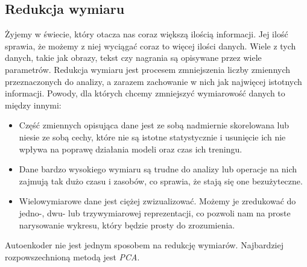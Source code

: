 \documentclass[a4paper,12pt,oneside]{book} %
\begin{document}
\subsection{Redukcja wymiaru}
Żyjemy w świecie, który otacza nas coraz większą ilością informacji. Jej ilość sprawia, że możemy z niej wyciągać coraz to więcej ilości danych. Wiele z tych danych, takie jak obrazy, tekst czy nagrania są opisywane przez wiele parametrów. Redukcja wymiaru jest procesem zmniejszenia liczby zmiennych przeznaczonych do analizy, a zarazem zachowanie w nich jak najwięcej istotnych informacji. Powody, dla których chcemy zmniejszyć wymiarowość danych to między innymi:
\begin{itemize}
	\item Część zmiennych opisująca dane jest ze sobą nadmiernie skorelowana lub niesie ze sobą cechy, które nie są istotne statystycznie i usunięcie ich nie wpływa na poprawę działania modeli oraz czas ich treningu.
	\item Dane bardzo wysokiego wymiaru są trudne do analizy lub operacje na nich zajmują tak dużo czasu i zasobów, co sprawia, że stają się one bezużyteczne. 
	\item Wielowymiarowe dane jest ciężej zwizualizować. Możemy je zredukować do jedno-, dwu- lub trzywymiarowej reprezentacji, co pozwoli nam na proste narysowanie wykresu, który będzie prosty do zrozumienia.
\end{itemize}
Autoenkoder nie jest jednym sposobem na redukcję wymiarów. Najbardziej rozpowszechnioną metodą jest \textit{PCA}. 
\end{document}
